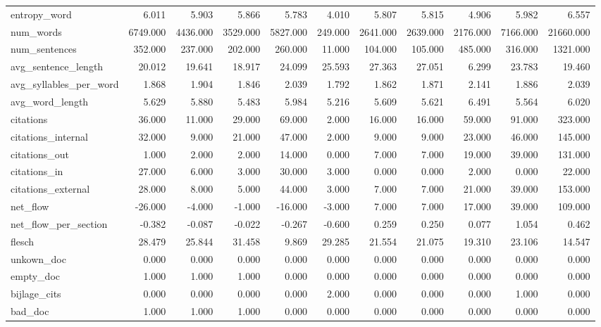 \begin{tabular}{lrrrrrrrrrr}
\cline{1-11}
entropy\_word & 6.011 & 5.903 & 5.866 & 5.783 & 4.010 & 5.807 & 5.815 & 4.906 & 5.982 & 6.557 \\
\cline{1-11}
num\_words & 6749.000 & 4436.000 & 3529.000 & 5827.000 & 249.000 & 2641.000 & 2639.000 & 2176.000 & 7166.000 & 21660.000 \\
\cline{1-11}
num\_sentences & 352.000 & 237.000 & 202.000 & 260.000 & 11.000 & 104.000 & 105.000 & 485.000 & 316.000 & 1321.000 \\
\cline{1-11}
avg\_sentence\_length & 20.012 & 19.641 & 18.917 & 24.099 & 25.593 & 27.363 & 27.051 & 6.299 & 23.783 & 19.460 \\
\cline{1-11}
avg\_syllables\_per\_word & 1.868 & 1.904 & 1.846 & 2.039 & 1.792 & 1.862 & 1.871 & 2.141 & 1.886 & 2.039 \\
\cline{1-11}
avg\_word\_length & 5.629 & 5.880 & 5.483 & 5.984 & 5.216 & 5.609 & 5.621 & 6.491 & 5.564 & 6.020 \\
\cline{1-11}
citations & 36.000 & 11.000 & 29.000 & 69.000 & 2.000 & 16.000 & 16.000 & 59.000 & 91.000 & 323.000 \\
\cline{1-11}
citations\_internal & 32.000 & 9.000 & 21.000 & 47.000 & 2.000 & 9.000 & 9.000 & 23.000 & 46.000 & 145.000 \\
\cline{1-11}
citations\_out & 1.000 & 2.000 & 2.000 & 14.000 & 0.000 & 7.000 & 7.000 & 19.000 & 39.000 & 131.000 \\
\cline{1-11}
citations\_in & 27.000 & 6.000 & 3.000 & 30.000 & 3.000 & 0.000 & 0.000 & 2.000 & 0.000 & 22.000 \\
\cline{1-11}
citations\_external & 28.000 & 8.000 & 5.000 & 44.000 & 3.000 & 7.000 & 7.000 & 21.000 & 39.000 & 153.000 \\
\cline{1-11}
net\_flow & -26.000 & -4.000 & -1.000 & -16.000 & -3.000 & 7.000 & 7.000 & 17.000 & 39.000 & 109.000 \\
\cline{1-11}
net\_flow\_per\_section & -0.382 & -0.087 & -0.022 & -0.267 & -0.600 & 0.259 & 0.250 & 0.077 & 1.054 & 0.462 \\
\cline{1-11}
flesch & 28.479 & 25.844 & 31.458 & 9.869 & 29.285 & 21.554 & 21.075 & 19.310 & 23.106 & 14.547 \\
\cline{1-11}
unkown\_doc & 0.000 & 0.000 & 0.000 & 0.000 & 0.000 & 0.000 & 0.000 & 0.000 & 0.000 & 0.000 \\
\cline{1-11}
empty\_doc & 1.000 & 1.000 & 1.000 & 0.000 & 0.000 & 0.000 & 0.000 & 0.000 & 0.000 & 0.000 \\
\cline{1-11}
bijlage\_cits & 0.000 & 0.000 & 0.000 & 0.000 & 2.000 & 0.000 & 0.000 & 0.000 & 1.000 & 0.000 \\
\cline{1-11}
bad\_doc & 1.000 & 1.000 & 1.000 & 0.000 & 0.000 & 0.000 & 0.000 & 0.000 & 0.000 & 0.000 \\
\cline{1-11}
\bottomrule
\end{tabular}
